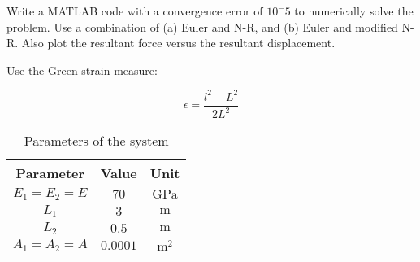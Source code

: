 Write a MATLAB code with a convergence error of $10^-5$ to numerically solve the problem.
Use a combination of (a) Euler and N-R, and (b) Euler and modified N-R.
Also plot the resultant force versus the resultant displacement.

Use the Green strain measure:

\begin{equation}
    \epsilon = \frac{l^2 - L^2}{2L^2}
\end{equation}

\begin{table}[H]
    \centering
    \begin{tabular}{|c|c|c|}
        \hline
        \textbf{Parameter} & \textbf{Value} & \textbf{Unit} \\ \hline
        $E_1 = E_2 = E$    & $70$           & $\text{GPa}$  \\ \hline
        $L_1$              & $3$            & $\text{m}$    \\ \hline
        $L_2$              & $0.5$          & $\text{m}$    \\ \hline
        $A_1 = A_2 = A$    & $0.0001$       & $\text{m}^2$  \\ \hline
    \end{tabular}
    \caption{Parameters of the system}
    \label{tab:parameters_of_the_system}
\end{table}
